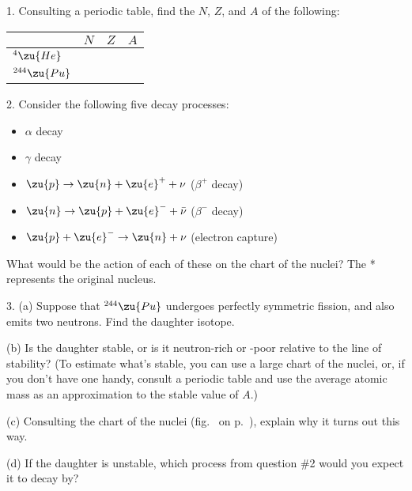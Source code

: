 
1. Consulting a periodic table, find the $N$, $Z$, and $A$ of the following:

\begin{tabular}{|l|p{15mm}|p{15mm}|p{15mm}|}
\hline
& $N$ & $Z$ & $A$ \\
\hline
${}^4\zu{He}$ & & & \\
\hline
${}^{244}\zu{Pu}$ & & & \\
\hline
\end{tabular}

\vfill

2. Consider the following five decay processes:

\begin{itemize}

\item $\alpha$ decay

\item $\gamma$ decay

\item $\zu{p} \rightarrow \zu{n} + \zu{e}^+ + \nu$ ($\beta^+$ decay)

\item $\zu{n} \rightarrow \zu{p} + \zu{e}^- + \bar{\nu}$ ($\beta^-$ decay)

\item $\zu{p} + \zu{e}^- \rightarrow \zu{n} + \nu$ (electron capture)
\end{itemize}

What would be the action of each of these on the chart of the nuclei? The * represents the original nucleus.


\vfill

3. (a) Suppose that ${}^{244}\zu{Pu}$ undergoes perfectly symmetric fission, and also emits two neutrons.
Find the daughter isotope.

(b) Is the daughter stable, or is it neutron-rich or -poor relative to the line of stability? (To estimate
what's stable, you can use a large chart of the nuclei, or, if you don't have one handy,
consult a periodic table and use the average atomic mass as an
approximation to the stable value of $A$.)

(c) Consulting the chart of the nuclei (fig.~ on p.~\pageref{fig:chartofnuclei}),
explain why it turns out this way.

(d) If the daughter is unstable, which process from question \#2
would you expect it to decay by?
